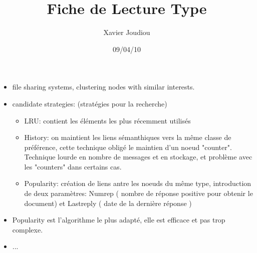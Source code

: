 \documentclass[11pt,a4paper]{article}
\title{Fiche de Lecture Type}
\author{Xavier Joudiou}
\date{09/04/10}
\begin{document}
	
  \begin{itemize}
  \renewcommand{\labelitemi}{$\Rightarrow$}
	\item file sharing systems, clustering nodes with similar interests.
	\item candidate strategies: (stratégies pour la recherche) 
	\begin{itemize}
		\item LRU: contient les éléments les plus récemment utilisés
		\item History: on maintient les liens sémanthiques vers la même classe de préférence, cette technique obligé le maintien d'un noeud "counter". Technique lourde en nombre de messages et en stockage, et problème avec les "counters" dans certains cas.  
		\item Popularity: création de liens antre les noeuds du même type, introduction de deux paramètres: Numrep ( nombre de réponse positive pour obtenir le document) et Lastreply ( date de la dernière réponse )
	\end{itemize} 
	\item Popularity est l'algorithme le plus adapté, elle est efficace et pas trop complexe.
	\item ...
  \end{itemize}
\end{document}
